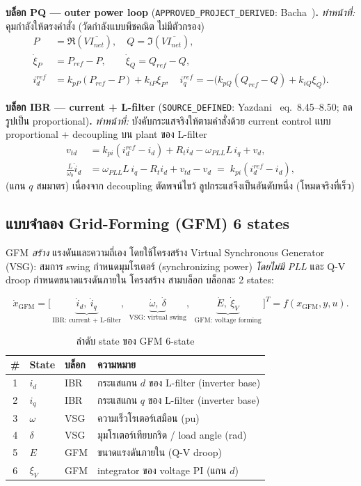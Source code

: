 \documentclass[12pt,a4paper]{article}
\begin{document}
\noindent\textbf{บล็อก PQ --- outer power loop} (\texttt{APPROVED\_PROJECT\_DERIVED}: Bacha~\cite{bacha2014})\textbf{.}
\emph{ทำหน้าที่:} คุมกำลังให้ตรงคำสั่ง (วัดกำลังแบบพีชคณิต ไม่มีตัวกรอง)
\begin{align}
P &= \Re(V\overline{I_{net}}),\quad Q = \Im(V\overline{I_{net}}),\\
\dot\xi_{P} &= P_{ref}-P,\qquad \dot\xi_{Q} = Q_{ref}-Q,\\
i_d^{ref} &= k_{pP}(P_{ref}-P)+k_{iP}\xi_{P},\quad
i_q^{ref} = -\big(k_{pQ}(Q_{ref}-Q)+k_{iQ}\xi_{Q}\big).
\end{align}

\noindent\textbf{บล็อก IBR --- current + L-filter} (\texttt{SOURCE\_DEFINED}: Yazdani~\cite{yazdani2010}
eq.~8.45--8.50; ลดรูปเป็น proportional)\textbf{.} \emph{ทำหน้าที่:} บังคับกระแสจริงให้ตามคำสั่งด้วย
current control แบบ proportional + decoupling บน plant ของ L-filter
\begin{align}
v_{td} &= k_{pi}(i_d^{ref}-i_d)+R_t i_d-\omega_{PLL}L\,i_q+v_d,\\
\tfrac{L}{\omega_b}\dot i_d &= \omega_{PLL}L\,i_q-R_t i_d+v_{td}-v_d
\;=\; k_{pi}(i_d^{ref}-i_d),
\end{align}
(แกน $q$ สมมาตร) เนื่องจาก decoupling ตัดพจน์ไขว้ ลูปกระแสจึงเป็นอันดับหนึ่ง (โหมดจริงที่เร็ว)

\subsection{แบบจำลอง Grid-Forming (GFM) 6 states}
\label{subsec:gfm}

GFM \emph{สร้าง} แรงดันและความถี่เอง โดยใช้โครงสร้าง Virtual Synchronous Generator (VSG): สมการ swing
กำหนดมุมโรเตอร์ (synchronizing power) \emph{โดยไม่มี PLL} และ Q-V droop กำหนดขนาดแรงดันภายใน โครงสร้าง
สามบล็อก บล็อกละ 2 states:

\begin{equation}
\dot x_{\text{GFM}} =\Big[\,
\underbrace{\dot i_d,\ \dot i_q}_{\text{IBR: current + L-filter}},\ \,
\underbrace{\dot\omega,\ \dot\delta}_{\text{VSG: virtual swing}},\ \,
\underbrace{\dot E,\ \dot\xi_{V}}_{\text{GFM: voltage forming}}
\,\Big]^{T}= f(x_{\text{GFM}},y,u).
\label{eq:gfm-order}
\end{equation}

\begin{table}[H]\centering\small
\caption{ลำดับ state ของ GFM 6-state}
\label{tab:order-gfm}
\begin{tabular}{clll}\toprule
\# & State & บล็อก & ความหมาย\\\midrule
1 & $i_d$    & IBR & กระแสแกน $d$ ของ L-filter (inverter base)\\
2 & $i_q$    & IBR & กระแสแกน $q$ ของ L-filter (inverter base)\\
3 & $\omega$ & VSG & ความเร็วโรเตอร์เสมือน (pu)\\
4 & $\delta$ & VSG & มุมโรเตอร์เทียบกริด / load angle (rad)\\
5 & $E$      & GFM & ขนาดแรงดันภายใน (Q-V droop)\\
6 & $\xi_{V}$& GFM & integrator ของ voltage PI (แกน $d$)\\\bottomrule
\end{tabular}\end{table}
\end{document}
